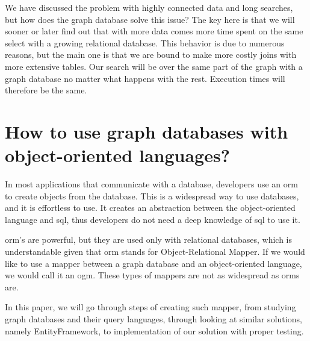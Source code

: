 \begin{introduction}
    We have discussed the problem with highly connected data and long searches, but how does the graph database solve this issue? The key here is that we will sooner or later find out that with more data comes more time spent on the same select with a growing relational database. This behavior is due to numerous reasons, but the main one is that we are bound to make more costly joins with more extensive tables. Our search will be over the same part of the graph with a graph database no matter what happens with the rest. Execution times will therefore be the same.

    \section{How to use graph databases with object-oriented languages?}

    In most applications that communicate with a database, developers use an \acrshort{orm} to create objects from the database.
    This is a widespread way to use databases, and it is effortless to use. It creates an abstraction between the object-oriented language and \acrshort{sql}, thus developers
    do not need a deep knowledge of \acrshort{sql} to use it.

    \acrshort{orm}'s are powerful, but they are used only with relational databases, which is understandable given that \acrshort{orm} stands for Object-Relational Mapper.
    If we would like to use a mapper between a graph database and an object-oriented language, we would call it an \acrfull{ogm}. These types of mappers are not
    as widespread as \acrshort{orm}s are.

    In this paper, we will go through steps of creating such mapper, from studying graph databases and their query languages, through looking at similar solutions, namely EntityFramework,
    to implementation of our solution with proper testing.

\end{introduction}
